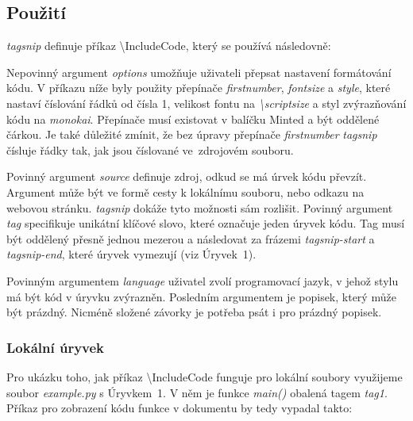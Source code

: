 \documentclass{article}
\begin{document}
\subsection*{Použití}

\textit{tagsnip} definuje příkaz \textbackslash{}IncludeCode, který se používá následovně:


Nepovinný argument \textit{options} umožňuje uživateli přepsat nastavení formátování kódu. 
V příkazu níže byly použity přepínače \textit{firstnumber}, \textit{fontsize} a \textit{style},
které nastaví číslování řádků od čísla 1, velikost fontu na \nobreak\textit{\textbackslash{}scriptsize}
a styl zvýrazňování kódu na \textit{monokai}. 
Přepínače musí existovat v balíčku Minted \citep{minted} a být oddělené čárkou. Je také důležité zmínit, že bez úpravy
přepínače \textit{firstnumber} \textit{tagsnip} čísluje řádky tak, jak jsou číslované ve~zdrojovém souboru.


Povinný argument \textit{source} definuje zdroj, odkud se má
úrvek kódu převzít. Argument může být ve formě cesty k lokálnímu souboru, nebo odkazu na webovou stránku.
\textit{tagsnip} dokáže tyto možnosti sám rozlišit. Povinný argument \textit{tag} specifikuje 
unikátní klíčové slovo, které označuje jeden úryvek kódu. Tag musí být oddělený přesně jednou mezerou a 
následovat za frázemi \textit{tagsnip-start} a \textit{tagsnip-end}, 
které úryvek vymezují (viz Úryvek~1).


Povinným argumentem \textit{language} uživatel zvolí programovací jazyk, v jehož stylu má 
být kód v úryvku zvýrazněn. Posledním argumentem je popisek, který může být prázdný. 
Nicméně složené závorky je potřeba psát i pro prázdný popisek.

\subsubsection*{Lokální úryvek}

Pro ukázku toho, jak příkaz \textbackslash{}IncludeCode funguje pro lokální soubory využijeme
soubor \textit{example.py} s Úryvkem~1. V něm je funkce \textit{main()} obalená tagem \textit{tag1}. 
Příkaz pro zobrazení kódu funkce v dokumentu by tedy vypadal takto:
\end{document}
